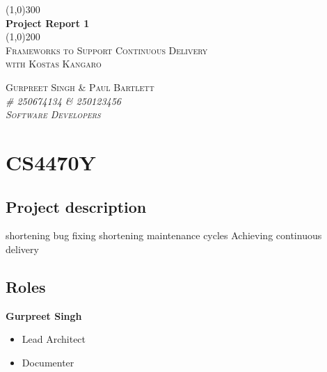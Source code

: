 \documentclass[11pt,]{article}
\begin{document}
\doublespacing

\begin{titlepage}
    \begin{center}
    \line(1,0){300} \\ 
    [0.25in]
    \huge{\bfseries Project Report 1} \\
    [2mm]
    \line(1,0){200} \\
    [1.5cm] 
    \textsc{\Large Frameworks to Support Continuous Delivery} \\
    [0.75cm]
    \textsc{\Large with Kostas Kangaro} \\
    [10cm]
    \end{center}
    
    \begin{flushright}
    \textsc{\Large{Gurpreet Singh \& Paul Bartlett \\} \normalsize\emph{\# 250674134 \& 250123456 \\} \normalsize\emph{Software Developers \\} }
    
    \end{flushright}
    
\end{titlepage}


\newpage

{
\hypersetup{linkcolor=black}
\setcounter{tocdepth}{2}
\tableofcontents
\newpage
}
\section{CS4470Y}\label{cs4470y}

\subsection{Project description}\label{project-description}

shortening bug fixing shortening maintenance cycles Achieving continuous
delivery

\subsection{Roles}\label{roles}

\textbf{Gurpreet Singh}

\begin{itemize}
\item
  Lead Architect
\item
  Documenter
\end{itemize}
\end{document}
